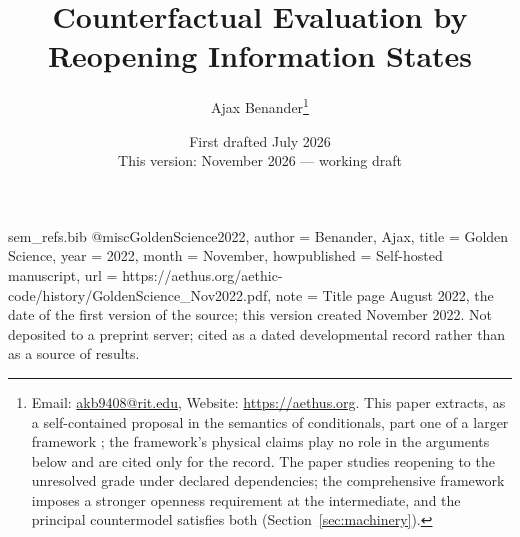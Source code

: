 \begin{filecontents}[overwrite]{sem_refs.bib}
@misc{GoldenScience2022,
  author       = {Benander, Ajax},
  title        = {Golden Science},
  year         = {2022},
  month        = {November},
  howpublished = {Self-hosted manuscript},
  url          = {https://aethus.org/aethic-code/history/GoldenScience_Nov2022.pdf},
  note         = {Title page August 2022, the date of the first version of the source; this version created November 2022. Not deposited to a
                  preprint server; cited as a dated developmental record rather than
                  as a source of results.}
}
\end{filecontents}

\documentclass[11pt]{article}
\usepackage[margin=1.05in]{geometry}
\usepackage{amsmath, amssymb, amsthm}
\theoremstyle{definition}\newtheorem{definition}{Definition}\theoremstyle{plain}
\newtheorem{lemma}{Lemma}
\newtheorem{proposition}{Proposition}
\newtheorem{theorem}{Theorem}
\newtheorem{corollary}{Corollary}
\newtheorem{principle}[theorem]{Principle}
\usepackage[hidelinks]{hyperref}
\usepackage{microtype}
\usepackage[style=authoryear, sorting=nyt, maxcitenames=2, maxbibnames=99, giveninits=true, uniquename=false, uniquelist=false, dashed=false, useprefix=true, date=year]{biblatex}
\usepackage{booktabs}



\title{Counterfactual Evaluation by Reopening Information States}
\author{Ajax Benander\thanks{Email: \href{mailto:akb9408@rit.edu}{akb9408@rit.edu}, Website: \url{https://aethus.org}. This paper extracts, as a self-contained proposal in the semantics of conditionals, part one of a larger framework \parencite{Aethus, AethusBrief}; the framework's physical claims play no role in the arguments below and are cited only for the record. The paper studies reopening to the unresolved grade under declared dependencies; the comprehensive framework imposes a stronger openness requirement at the intermediate, and the principal countermodel satisfies both (Section~\ref{sec:machinery}).}}
\date{First drafted July 2026\\ {\small This version: November 2026 --- working draft}}


